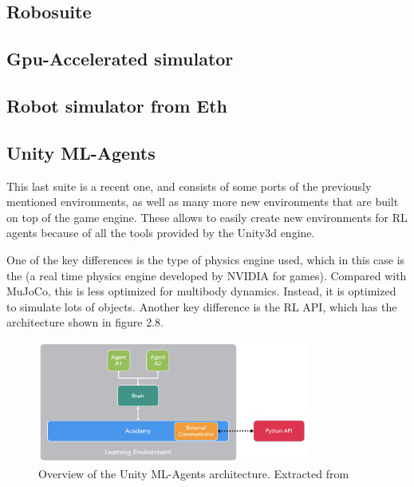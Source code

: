    \subsection{Robosuite}
 
    \subsection{Gpu-Accelerated simulator}

    \subsection{Robot simulator from Eth}

    \subsection{Unity ML-Agents}
    This last suite \citep{unity-ml-agents} is a recent one, and consists of some ports of the previously mentioned environments, as well
    as many more new environments that are built on top of the \citeauthor{unity} game engine. These allows to easily create new environments
    for RL agents because of all the tools provided by the Unity3d engine.

    One of the key differences is the type of physics engine used, which in this case is the \citeauthor{physX} (a real time physics engine
    developed by NVIDIA for games). Compared with MuJoCo, this is less optimized for multibody dynamics. Instead, it is optimized to simulate
    lots of objects. Another key difference is the RL API, which has the architecture shown in figure 2.8.

    \begin{figure}[!ht]
        \centering
        \includegraphics[width=3.5in]{./chapters/imgs/img_unity_mlagents_api_overview.png}
        \caption[unity ml agents overview]{Overview of the Unity ML-Agents architecture. Extracted from \citet{unity-ml-agents}}
        \label{fig:unity-ml-agents-overview}
    \end{figure}

